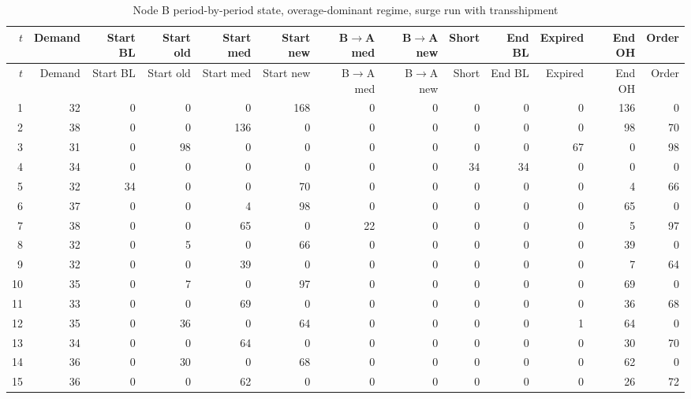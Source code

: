 \documentclass[11pt]{article}
\begin{document}
\begin{landscape}
\begin{longtable}{rrrrrrrrrrrrr}
\caption{Node B period-by-period state, overage-dominant regime, surge run with transshipment}\label{tab:appendix-overage-b}\\
\toprule
$t$ & Demand & Start BL & Start old & Start med & Start new & B$\rightarrow$A med & B$\rightarrow$A new & Short & End BL & Expired & End OH & Order \\
\midrule
\endfirsthead
\toprule
$t$ & Demand & Start BL & Start old & Start med & Start new & B$\rightarrow$A med & B$\rightarrow$A new & Short & End BL & Expired & End OH & Order \\
\midrule
\endhead
1 & 32 & 0 & 0 & 0 & 168 & 0 & 0 & 0 & 0 & 0 & 136 & 0 \\
2 & 38 & 0 & 0 & 136 & 0 & 0 & 0 & 0 & 0 & 0 & 98 & 70 \\
3 & 31 & 0 & 98 & 0 & 0 & 0 & 0 & 0 & 0 & 67 & 0 & 98 \\
4 & 34 & 0 & 0 & 0 & 0 & 0 & 0 & 34 & 34 & 0 & 0 & 0 \\
5 & 32 & 34 & 0 & 0 & 70 & 0 & 0 & 0 & 0 & 0 & 4 & 66 \\
6 & 37 & 0 & 0 & 4 & 98 & 0 & 0 & 0 & 0 & 0 & 65 & 0 \\
7 & 38 & 0 & 0 & 65 & 0 & 22 & 0 & 0 & 0 & 0 & 5 & 97 \\
8 & 32 & 0 & 5 & 0 & 66 & 0 & 0 & 0 & 0 & 0 & 39 & 0 \\
9 & 32 & 0 & 0 & 39 & 0 & 0 & 0 & 0 & 0 & 0 & 7 & 64 \\
10 & 35 & 0 & 7 & 0 & 97 & 0 & 0 & 0 & 0 & 0 & 69 & 0 \\
11 & 33 & 0 & 0 & 69 & 0 & 0 & 0 & 0 & 0 & 0 & 36 & 68 \\
12 & 35 & 0 & 36 & 0 & 64 & 0 & 0 & 0 & 0 & 1 & 64 & 0 \\
13 & 34 & 0 & 0 & 64 & 0 & 0 & 0 & 0 & 0 & 0 & 30 & 70 \\
14 & 36 & 0 & 30 & 0 & 68 & 0 & 0 & 0 & 0 & 0 & 62 & 0 \\
15 & 36 & 0 & 0 & 62 & 0 & 0 & 0 & 0 & 0 & 0 & 26 & 72 \\
\bottomrule
\end{longtable}


\end{landscape}
\end{document}
